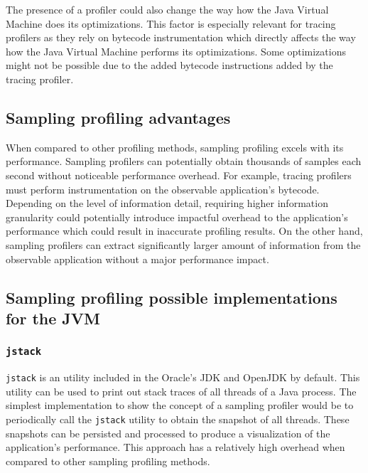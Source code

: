 \documentclass[..thesis.tex]{subfiles}
\begin{document}
The presence of a profiler could also change the way how the Java Virtual Machine does its optimizations. This factor is especially relevant for tracing profilers as they rely on bytecode instrumentation which directly affects the way how the Java Virtual Machine performs its optimizations. Some optimizations might not be possible due to the added bytecode instructions added by the tracing profiler. \cite{mytkowicz_evaluating_2010} 



\subsection{Sampling profiling advantages}
When compared to other profiling methods, sampling profiling excels with its performance. Sampling profilers can potentially obtain thousands of samples each second without noticeable performance overhead. For example, tracing profilers must perform instrumentation on the observable application's bytecode. Depending on the level of information detail, requiring higher information granularity
could potentially introduce impactful overhead to the application's performance which could result in inaccurate profiling results. On the other hand, sampling profilers can extract significantly larger amount of information from the observable application without a major performance impact.


\subsection{Sampling profiling possible implementations for the JVM}

\subsubsection{\texttt{jstack}}
\texttt{jstack} is an utility included in the Oracle's JDK and OpenJDK by default. This utility can be used to print out stack traces of all threads of a Java process.\cite{jstack} The simplest implementation to show the concept of a sampling profiler would be to periodically call the \texttt{jstack} utility to obtain the snapshot of all threads. These snapshots can be persisted and processed to produce a visualization of the application's performance. This approach has a relatively high overhead when compared to other sampling profiling methods.
\end{document}

